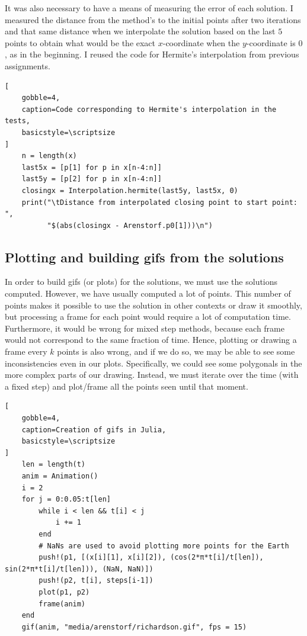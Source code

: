 \documentclass[12pt, onside]{article}
\begin{document}
    It was also necessary to have a means of measuring the error of each solution.
I measured the distance from the method's to the initial points after two iterations
and that same distance when we interpolate the solution based on the last $5$ points
to obtain what would be the exact $x$-coordinate when the $y$-coordinate is $0$,
as in the beginning.
I reused the code for Hermite's interpolation from previous assignments.

\begin{lstlisting}[
    gobble=4,
    caption=Code corresponding to Hermite's interpolation in the tests,
    basicstyle=\scriptsize
]
    n = length(x)
    last5x = [p[1] for p in x[n-4:n]]
    last5y = [p[2] for p in x[n-4:n]]
    closingx = Interpolation.hermite(last5y, last5x, 0)
    print("\tDistance from interpolated closing point to start point: ",
          "$(abs(closingx - Arenstorf.p0[1]))\n")
\end{lstlisting}

\subsection{Plotting and building gifs from the solutions}

    In order to build gifs (or plots) for the solutions, we must use the solutions computed.
However, we have usually computed a lot of points.
This number of points makes it possible to use the solution in other contexts
or draw it smoothly,
but processing a frame for each point would require a lot of computation time.
Furthermore, it would be wrong for mixed step methods,
because each frame would not correspond to the same fraction of time.
Hence, plotting or drawing a frame every $k$ points is also wrong,
and if we do so,
we may be able to see some inconsistencies even in our plots.
Specifically, we could see some polygonals in the more complex parts of our drawing.
Instead, we must iterate over the time (with a fixed step) and plot/frame
all the points seen until that moment.

\begin{lstlisting}[
    gobble=4,
    caption=Creation of gifs in Julia,
    basicstyle=\scriptsize
]
    len = length(t)
    anim = Animation()
    i = 2
    for j = 0:0.05:t[len]
        while i < len && t[i] < j
            i += 1
        end
        # NaNs are used to avoid plotting more points for the Earth
        push!(p1, [(x[i][1], x[i][2]), (cos(2*π*t[i]/t[len]), sin(2*π*t[i]/t[len])), (NaN, NaN)])
        push!(p2, t[i], steps[i-1])
        plot(p1, p2)
        frame(anim)
    end
    gif(anim, "media/arenstorf/richardson.gif", fps = 15)
\end{lstlisting}
\end{document}
